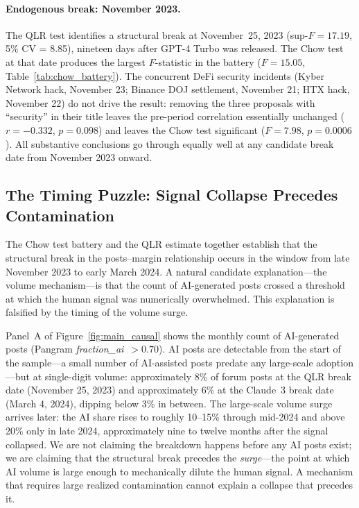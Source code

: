 \documentclass[12pt]{article}
\begin{document}
\paragraph{Endogenous break: November 2023.}
The QLR test identifies a structural break at November~25, 2023
(sup-$F = 17.19$, 5\% CV = 8.85), nineteen days after GPT-4 Turbo was released.
The Chow test at that date produces the largest $F$-statistic in the battery
($F = 15.05$, Table~\ref{tab:chow_battery}). The concurrent DeFi security incidents
(Kyber Network hack, November 23; Binance DOJ settlement, November 21; HTX hack,
November 22) do not drive the result: removing the three proposals with
``security'' in their title leaves the pre-period correlation essentially unchanged
($r = -0.332$, $p = 0.098$) and leaves the Chow test significant
($F = 7.98$, $p = 0.0006$). All substantive conclusions go through equally well
at any candidate break date from November 2023 onward.

\subsection{The Timing Puzzle: Signal Collapse Precedes Contamination}

The Chow test battery and the QLR estimate together establish that the structural
break in the posts--margin relationship occurs in the window from late November 2023
to early March 2024. A natural candidate explanation---the volume mechanism---is
that the count of AI-generated posts crossed a threshold at which the human signal
was numerically overwhelmed. This explanation is falsified by the timing of the
volume surge.

Panel~A of Figure~\ref{fig:main_causal} shows the monthly count of AI-generated
posts (Pangram \textit{fraction\_ai}~$> 0.70$). AI posts are detectable from the
start of the sample---a small number of AI-assisted posts predate any large-scale
adoption---but at single-digit volume: approximately 8\% of forum posts at the QLR break
date (November 25, 2023) and approximately 6\% at the Claude~3 break date (March 4, 2024),
dipping below 3\% in between.
The large-scale volume surge arrives later: the AI share rises to roughly 10--15\%
through mid-2024 and above 20\% only in late 2024, approximately nine to twelve
months after the signal collapsed. We are not claiming the breakdown happens
before any AI posts exist; we are claiming that the structural break precedes the
\emph{surge}---the point at which AI volume is large enough to mechanically
dilute the human signal. A mechanism that requires large realized contamination
cannot explain a collapse that precedes it.
\end{document}
